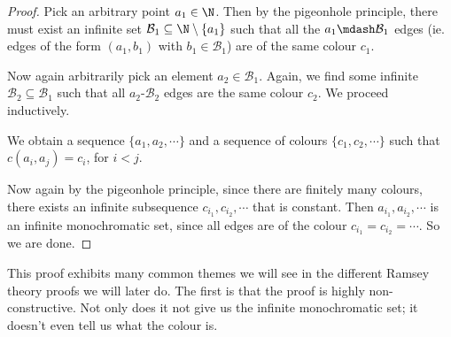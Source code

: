 \documentclass[a4paper]{article}
\begin{document}
\begin{proof}
  Pick an arbitrary point $a_1 \in \N$. Then by the pigeonhole principle, there must exist an infinite set $\mathcal{B}_1 \subseteq \N \setminus \{a_1\}$ such that all the $a_1\mdash \mathcal{B}_1$ edges (ie. edges of the form $(a_1, b_1)$ with $b_1 \in \mathcal{B}_1$) are of the same colour $c_1$.

  Now again arbitrarily pick an element $a_2 \in \mathcal{B}_1$. Again, we find some infinite $\mathcal{B}_2 \subseteq \mathcal{B}_1$ such that all $a_2$-$\mathcal{B}_2$ edges are the same colour $c_2$. We proceed inductively.
  \begin{center}
  \end{center}
  We obtain a sequence $\{a_1, a_2, \cdots\}$ and a sequence of colours $\{c_1, c_2, \cdots\}$ such that $c(a_i, a_j) = c_i$, for $i < j$.

  Now again by the pigeonhole principle, since there are finitely many colours, there exists an infinite subsequence $c_{i_1}, c_{i_2}, \cdots$ that is constant. Then $a_{i_1}, a_{i_2}, \cdots$ is an infinite monochromatic set, since all edges are of the colour $c_{i_1} = c_{i_2} = \cdots$. So we are done.
\end{proof}
This proof exhibits many common themes we will see in the different Ramsey theory proofs we will later do. The first is that the proof is highly non-constructive. Not only does it not give us the infinite monochromatic set; it doesn't even tell us what the colour is.
\end{document}
